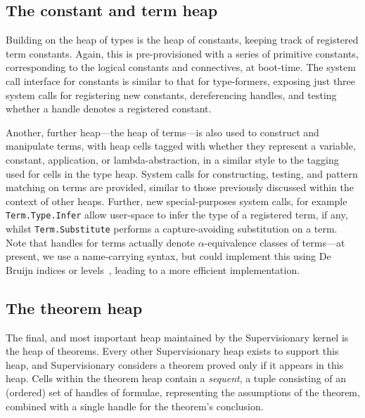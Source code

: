 \documentclass[a4paper, UKenglish, cleveref, autoref, thm-restate, colorlinks]{lipics-v2021}
\begin{document}
\subsection{The constant and term heap}

Building on the heap of types is the heap of constants, keeping track of registered term constants.
Again, this is pre-provisioned with a series of primitive constants, corresponding to the logical constants and connectives, at boot-time.
The system call interface for constants is similar to that for type-formers, exposing just three system calls for registering new constants, dereferencing handles, and testing whether a handle denotes a registered constant.

Another, further heap---the heap of terms---is also used to construct and manipulate terms, with heap cells tagged with whether they represent a variable, constant, application, or lambda-abstraction, in a similar style to the tagging used for cells in the type heap.
System calls for constructing, testing, and pattern matching on terms are provided, similar to those previously discussed within the context of other heaps.
Further, new special-purposes system calls, for example \texttt{Term.Type.Infer} allow user-space to infer the type of a registered term, if any, whilst \texttt{Term.Substitute} performs a capture-avoiding substitution on a term.
Note that handles for terms actually denote $\alpha$-equivalence classes of terms---at present, we use a name-carrying syntax, but could implement this using De Bruijn indices or levels~\cite{Bruijn1972LambdaCN}, leading to a more efficient implementation.

\subsection{The theorem heap}

The final, and most important heap maintained by the Supervisionary kernel is the heap of theorems.
Every other Supervisionary heap exists to support this heap, and Supervisionary considers a theorem proved only if it appears in this heap.
Cells within the theorem heap contain a \emph{sequent}, a tuple consisting of an (ordered) set of handles of formulae, representing the assumptions of the theorem, combined with a single handle for the theorem's conclusion.
\end{document}
